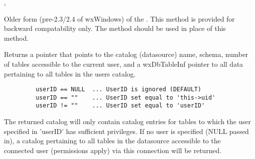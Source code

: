 
, 


\label{wxdbfwdonlycursors}


Older form (pre-2.3/2.4 of wxWindows) of the 
.  This method is 
provided for backward compatability only.  The method 
 should be 
used in place of this method. 



\label{wxdbgetcatalog}


Returns a  pointer that points to the catalog 
(datasource) name, schema, number of tables accessible to the current user, 
and a wxDbTableInf pointer to all data pertaining to all tables in the users 
catalog.



\begin{verbatim}
         userID == NULL  ... UserID is ignored (DEFAULT)
         userID == ""    ... UserID set equal to 'this->uid'
         userID != ""    ... UserID set equal to 'userID'
\end{verbatim}


The returned catalog will only contain catalog entries for tables to which the user specified in 'userID' has sufficient privileges.  If no user is specified (NULL passed in), a catalog pertaining to all tables in the datasource accessible to the connected user (permissions apply) via this connection will be returned.

\label{wxdbgetcolumncount}



